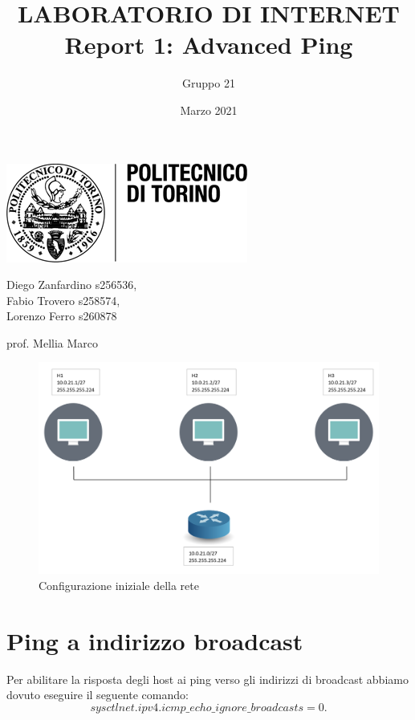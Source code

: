\documentclass{article}
\title{\Huge LABORATORIO DI INTERNET 
    \\ Report 1: Advanced Ping}
\author{Gruppo 21}
\date{Marzo 2021}
\begin{document}

\maketitle

\begin{center}
    \includegraphics[scale=0.75]{logo_poli.png}

    \vspace{20mm}

    Diego Zanfardino s256536, \\
    Fabio Trovero s258574, \\
    Lorenzo Ferro s260878

    \vspace{10mm}
    prof. Mellia Marco
\end{center}

\pagebreak

\begin{figure}
    \centering
    \includegraphics[scale=0.25]{rete1.png}
    \caption{Configurazione iniziale della rete}\label{Fig:data1}
\end{figure}

\section{Ping a indirizzo broadcast}
Per abilitare la risposta degli host ai ping verso gli indirizzi di broadcast abbiamo dovuto eseguire il seguente comando: 
$$sysctl net.ipv4.icmp\_echo\_ignore\_broadcasts=0.$$
\end{document}
